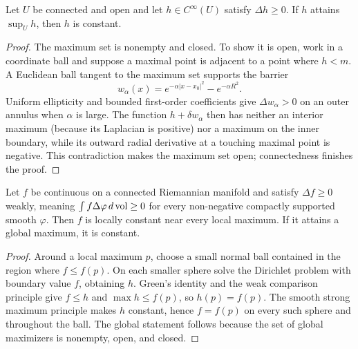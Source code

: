 \begin{lemma}
\label{lem:hopf-strong-maximum}




Let $U$ be connected and open and let $h\in C^\infty(U)$ satisfy
$\Delta h\ge0$. If $h$ attains $\sup_Uh$, then $h$ is constant.
\end{lemma}
\begin{proof}
\sketch
{}

The maximum set is nonempty and closed. To show it is open, work in a
coordinate ball and suppose a maximal point is adjacent to a point where
$h<m$. A Euclidean ball tangent to the maximum set supports the barrier
$$w_\alpha(x)=e^{-\alpha|x-x_0|^2}-e^{-\alpha R^2}.$$
Uniform ellipticity and bounded first-order coefficients give
$\Delta w_\alpha>0$ on an outer annulus when $\alpha$ is large. The
function $h+\delta w_\alpha$ then has neither an interior maximum
(because its Laplacian is positive) nor a maximum on the inner boundary,
while its outward radial derivative at a touching maximal point is
negative. This contradiction makes the maximum set open; connectedness
finishes the proof.
\end{proof}

\begin{theorem}
\label{thm:maximum-principle}


Let $f$ be continuous on a connected Riemannian manifold and satisfy
$\Delta f\ge0$ weakly, meaning
$\int f\Delta\varphi\,d\operatorname{vol}\ge0$ for every non-negative compactly
supported smooth $\varphi$. Then $f$ is locally constant near every
local maximum. If it attains a global maximum, it is constant.
\end{theorem}
\begin{proof}
\sketch

Around a local maximum $p$, choose a small normal ball contained in the
region where $f\le f(p)$. On each smaller sphere solve the Dirichlet
problem with boundary value $f$, obtaining $h$. Green's identity and the
weak comparison principle give $f\le h$ and
$\max h\le f(p)$, so $h(p)=f(p)$. The smooth strong maximum principle
makes $h$ constant, hence $f=f(p)$ on every such sphere and throughout
the ball. The global statement follows because the set of global
maximizers is nonempty, open, and closed.
\end{proof}

